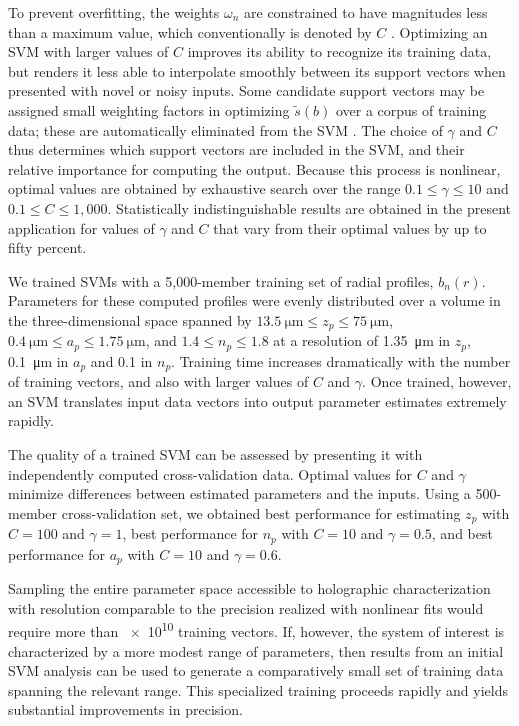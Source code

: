 To prevent overfitting, the weights $\omega_n$ are constrained to
have magnitudes less than a maximum value, which conventionally is denoted by
$C$ \cite{smola04}.
Optimizing an SVM with larger values of $C$ improves its ability to recognize its
training data, but renders it less able to interpolate smoothly
between its support vectors when presented with novel or noisy inputs.
Some candidate support vectors may be assigned small weighting
factors in optimizing $\tilde{s}(b)$ over a corpus of training data;
these are automatically eliminated from the SVM \cite{smola04}.
The choice of $\gamma$ and $C$ thus determines which support 
vectors are included in the SVM, and their relative importance for computing the output. 
Because this process is nonlinear, optimal values are obtained by
exhaustive search over the range $0.1 \leq \gamma \leq 10$ and
$0.1 \leq C \leq 1,000$.
Statistically indistinguishable results are obtained in the present application 
for values of $\gamma$ and $C$ that vary from their optimal values by
up to fifty percent. 

We trained SVMs with a 5,000-member training set of radial profiles,
$b_n(r)$.
Parameters for these computed profiles were evenly distributed over a volume in
the three-dimensional space spanned by
$\SI{13.5}{\um} \leq z_p \leq \SI{75}{\um}$,
$\SI{0.4}{\um} \leq a_p \leq \SI{1.75}{\um}$, and
$1.4 \leq n_p \leq 1.8$ at a resolution of
\SI{1.35}{\um} in $z_p$, 
\SI{0.1}{\um} in $a_p$ and 0.1 in $n_p$.
Training time increases dramatically with 
the number of training vectors, and also with larger values of $C$ and $\gamma$.
Once trained, however, an SVM translates input data vectors into 
output parameter estimates extremely rapidly.

The quality of a trained SVM can be assessed by presenting
it with independently computed cross-validation data.
Optimal values for $C$ and $\gamma$ minimize differences
between estimated parameters and the inputs.
Using a 500-member cross-validation set, we obtained
best performance for estimating $z_p$
with $C = 100$ and $\gamma = 1$, best performance
for $n_p$ with $C = 10$ and $\gamma = 0.5$, and
best performance for $a_p$ with $C = 10$ and $\gamma = 0.6$.

Sampling the entire parameter space accessible to
holographic characterization with resolution
comparable to the precision realized with nonlinear fits
\cite{lee07a}
would require more than \num{e10} training vectors.
If, however, the system of interest is characterized by a more modest range
of parameters, then results from an initial SVM analysis
can be used to generate a comparatively small set of training data
spanning the relevant range.
This specialized training proceeds rapidly
and yields substantial improvements in precision.

